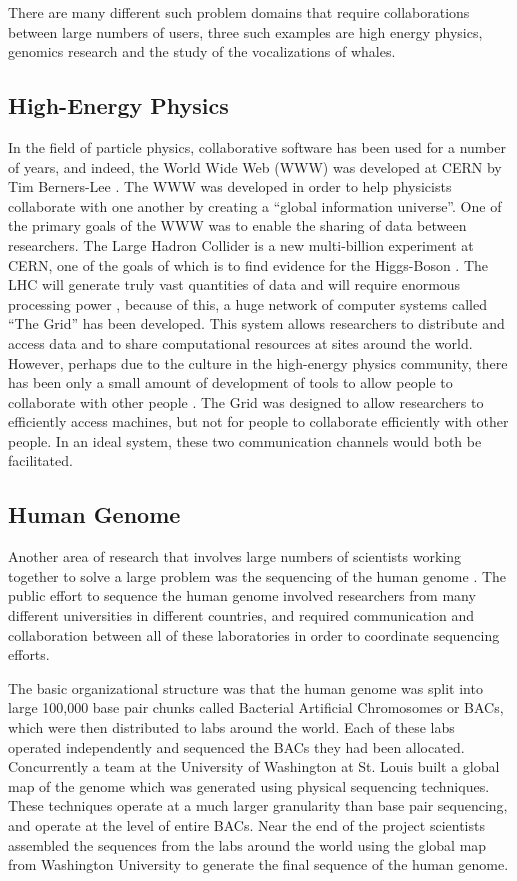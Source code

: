 There are many different such problem domains that require
collaborations between large numbers of users, three such examples are
high energy physics, genomics research and the study of the
vocalizations of whales.

\subsection{High-Energy Physics}

In the field of particle physics, collaborative software has been used
for a number of years, and indeed, the World Wide Web (WWW) was
developed at CERN by Tim Berners-Lee \cite{bernerslee92}.  The WWW was
developed in order to help physicists collaborate with one another by
creating a ``global information universe''.  One of the primary goals
of the WWW was to enable the sharing of data between researchers.  The
Large Hadron Collider is a new multi-billion experiment at CERN, one
of the goals of which is to find evidence for the Higgs-Boson
\cite{wells09}.  The LHC will generate truly vast quantities of data
and will require enormous processing power \cite{wiebalck03}, because
of this, a huge network of computer systems called ``The Grid'' has
been developed.  This system allows researchers to distribute and
access data and to share computational resources at sites around the
world.  However, perhaps due to the culture in the high-energy physics
community, there has been only a small amount of development of tools
\cite{birnholtz03} to allow people to collaborate with other people
\cite{horn04}.  The Grid was designed to allow researchers to
efficiently access machines, but not for people to collaborate
efficiently with other people.  In an ideal system, these two
communication channels would both be facilitated.

\subsection{Human Genome}

Another area of research that involves large numbers of scientists
working together to solve a large problem was the sequencing of the
human genome \cite{venter01}.  The public effort to sequence the human
genome involved researchers from many different universities in
different countries, and required communication and collaboration
between all of these laboratories in order to coordinate sequencing
efforts.

The basic organizational structure was that the human genome was split
into large 100,000 base pair chunks called Bacterial Artificial
Chromosomes or BACs, which were then distributed to labs around the
world.  Each of these labs operated independently and sequenced the
BACs they had been allocated.  Concurrently a team at the University
of Washington at St. Louis built a global map of the genome which was
generated using physical sequencing techniques.  These techniques
operate at a much larger granularity than base pair sequencing, and
operate at the level of entire BACs.  Near the end of the project
scientists assembled the sequences from the labs around the world
using the global map from Washington University to generate the final
sequence of the human genome.


